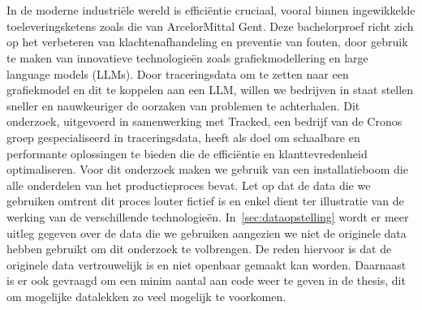 
\chapter{}%
\label{ch:inleiding}

In de moderne industriële wereld is efficiëntie cruciaal, vooral binnen ingewikkelde toeleveringsketens zoals die van ArcelorMittal Gent. 
Deze bachelorproef richt zich op het verbeteren van klachtenafhandeling en preventie van fouten, door gebruik te maken van innovatieve technologieën zoals grafiekmodellering en large language models (LLMs). 
Door traceringsdata om te zetten naar een grafiekmodel en dit te koppelen aan een LLM, willen we bedrijven in staat stellen sneller en nauwkeuriger de oorzaken van problemen te achterhalen. 
Dit onderzoek, uitgevoerd in samenwerking met Tracked, een bedrijf van de Cronos groep gespecialiseerd in traceringsdata, heeft als doel om schaalbare en performante oplossingen te bieden die de efficiëntie en klanttevredenheid optimaliseren.
Voor dit onderzoek maken we gebruik van een installatieboom die alle onderdelen van het productieproces bevat.
Let op dat de data die we gebruiken omtrent dit proces louter fictief is en enkel dient ter illustratie van de werking van de verschillende technologieën.
In~\ref{sec:dataopstelling} wordt er meer uitleg gegeven over de data die we gebruiken aangezien we niet de originele data hebben gebruikt om dit onderzoek te volbrengen.
De reden hiervoor is dat de originele data vertrouwelijk is en niet openbaar gemaakt kan worden. 
Daarnaast is er ook gevraagd om een minim aantal aan code weer te geven in de thesis, dit om mogelijke datalekken zo veel mogelijk te voorkomen.

\section{}%
\label{sec:probleemstelling}

